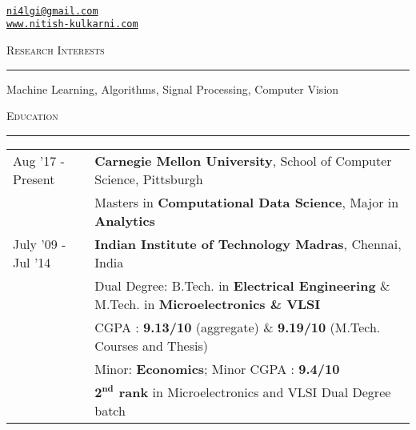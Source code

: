 \documentclass[8pt,a4paper,English]{article}
\newcommand{\lv}{\color{table-border}\vrule}
\newcommand\roottitle[1]{ \vspace{3mm} \noindent \textsc{ \large #1} \vspace{1.5mm} \nopagebreak[4] \color{gray} \hrule \color{black} \vspace{2mm} \noindent \small }
\begin{document}
 \\
\vspace{-5mm}

\begin{normalsize}
    \raggedleft \href{mailto:ni4lgi@gmail.com}{\texttt{ni4lgi\mbox{}@\mbox{}gmail.com}} \\
    \href{http://www.nitish-kulkarni.com}{\texttt{www.nitish-kulkarni.com}} \\
\end{normalsize}



\roottitle{Research Interests}
Machine Learning, Algorithms, Signal Processing, Computer Vision 

\roottitle{Education}
\renewcommand{\arraystretch}{1.2}
\setlength\tabcolsep{8pt}
\begin{tabularx}{\textwidth}{R{2.6cm} !{\lv} X}
  Aug '17 - Present  & \textbf{Carnegie Mellon University}, School of Computer Science, Pittsburgh\\
						& Masters in \textbf{Computational Data Science}, Major in \textbf{Analytics}\\
  July '09 - Jul '14    & \textbf{Indian Institute of Technology Madras}, Chennai, India \\
                        & Dual Degree: B.Tech. in \textbf{Electrical Engineering} \& M.Tech. in \textbf{Microelectronics \& VLSI} \\
                        & CGPA : \textbf{9.13/10} (aggregate) \& \textbf{9.19/10} (M.Tech. Courses and Thesis) \\
                        & Minor: \textbf{Economics}; Minor CGPA : \textbf{9.4/10} \\
                        & \textbf{ $\bm{2^{nd}}$ rank } in Microelectronics and VLSI Dual Degree batch
\end{tabularx}

\end{document}
